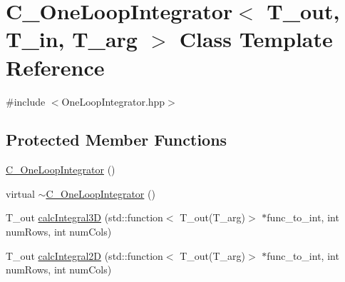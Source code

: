 \hypertarget{class_c___one_loop_integrator}{\section{C\-\_\-\-One\-Loop\-Integrator$<$ T\-\_\-out, T\-\_\-in, T\-\_\-arg $>$ Class Template Reference}
\label{class_c___one_loop_integrator}
}


{\ttfamily \#include $<$One\-Loop\-Integrator.\-hpp$>$}

\subsection*{Protected Member Functions}
\begin{DoxyCompactItemize}
\item 
\hyperlink{class_c___one_loop_integrator_a2cec9d83b4f5a12b03abf7bd28ef9f72}{C\-\_\-\-One\-Loop\-Integrator} ()
\item 
virtual \hyperlink{class_c___one_loop_integrator_afe89ae625faf097b591fce467e9d1eb5}{$\sim$\-C\-\_\-\-One\-Loop\-Integrator} ()
\item 
T\-\_\-out \hyperlink{class_c___one_loop_integrator_a9dd059711cbac033c88e1ab644ec3084}{calc\-Integral3\-D} (std\-::function$<$ T\-\_\-out(T\-\_\-arg)$>$ $\ast$func\-\_\-to\-\_\-int, int num\-Rows, int num\-Cols)
\item 
T\-\_\-out \hyperlink{class_c___one_loop_integrator_a7b35dcdd6f0f58d305bbaf53ba1afcd4}{calc\-Integral2\-D} (std\-::function$<$ T\-\_\-out(T\-\_\-arg)$>$ $\ast$func\-\_\-to\-\_\-int, int num\-Rows, int num\-Cols)
\end{DoxyCompactItemize}
